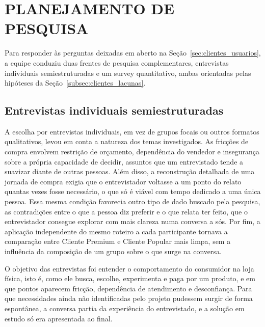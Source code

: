 %

\section{PLANEJAMENTO DE PESQUISA}
\label{sec:pesquisa_clientes_usuarios}

Para responder às perguntas deixadas em aberto na Seção~\ref{sec:clientes_usuarios}, a equipe conduziu duas frentes de pesquisa complementares, entrevistas individuais semiestruturadas e um survey quantitativo, ambas orientadas pelas hipóteses da Seção~\ref{subsec:clientes_lacunas}.

\subsection{Entrevistas individuais semiestruturadas}
\label{subsec:entrevistas}

A escolha por entrevistas individuais, em vez de grupos focais ou outros formatos qualitativos, levou em conta a natureza dos temas investigados. As fricções de compra envolvem restrição de orçamento, dependência do vendedor e insegurança sobre a própria capacidade de decidir, assuntos que um entrevistado tende a suavizar diante de outras pessoas. Além disso, a reconstrução detalhada de uma jornada de compra exigia que o entrevistador voltasse a um ponto do relato quantas vezes fosse necessário, o que só é viável com tempo dedicado a uma única pessoa. Essa mesma condição favorecia outro tipo de dado buscado pela pesquisa, as contradições entre o que a pessoa diz preferir e o que relata ter feito, que o entrevistador consegue explorar com mais clareza numa conversa a sós. Por fim, a aplicação independente do mesmo roteiro a cada participante tornava a comparação entre Cliente Premium e Cliente Popular mais limpa, sem a influência da composição de um grupo sobre o que surge na conversa.

O objetivo das entrevistas foi entender o comportamento do consumidor na loja física, isto é, como ele busca, escolhe, experimenta e paga por um produto, e em que pontos aparecem fricção, dependência de atendimento e desconfiança. Para que necessidades ainda não identificadas pelo projeto pudessem surgir de forma espontânea, a conversa partia da experiência do entrevistado, e a solução em estudo só era apresentada ao final.

